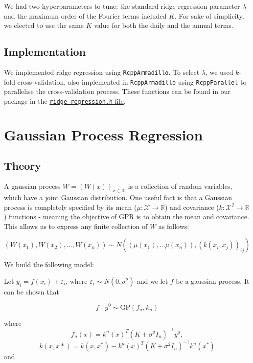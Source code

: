\documentclass[
]{article}
\begin{document}
We had two hyperparameters to tune: the standard ridge regression
parameter \(\lambda\) and the maximum order of the Fourier terms
included \(K\). For sake of simplicity, we elected to use the same \(K\)
value for both the daily and the annual terms.

\hypertarget{implementation}{%
\subsection{Implementation}\label{implementation}}

We implemented ridge regression using \texttt{RcppArmadillo}. To select
\(\lambda\), we used \(k\)-fold cross-validation, also implemented in
\texttt{RcppArmadillo} using \texttt{RcppParallel} to parallelise the
cross-validation process. These functions can be found in our package in
the
\href{https://github.com/Shermjj/SC-2-Electric-Boogalo/blob/main/ElecForecast/src/ridge_regression.h}{\texttt{ridge\_regression.h}
file}.

\hypertarget{gaussian-process-regression}{%
\section{Gaussian Process
Regression}\label{gaussian-process-regression}}

\hypertarget{theory-1}{%
\subsection{Theory}\label{theory-1}}

A gaussian process \(W = (W(x))_{x \in \mathcal{X}}\) is a collection of
random variables, which have a joint Gaussian distribution. One useful
fact is that a Gaussian process is completely specified by its mean
(\(\mu:\mathcal{X} \rightarrow \mathbb{R}\)) and covariance
(\(k:\mathcal{X}^2 \rightarrow \mathbb{R}\)) functions - meaning the
objective of GPR is to obtain the mean and covariance. This allows us to
express any finite collection of \(W\) as follows:

\[
(W(x_1), W(x_2), ..., W(x_n)) \sim N((\mu(x_1),...\mu(x_n)), (k(x_i,x_j))_{ij})
\]

We build the following model:

Let \(y_i = f(x_i) + \varepsilon_i\), where
\(\varepsilon_i \sim N(0, \sigma^2)\) and we let \(f\) be a gaussian
process. It can be shown that

\[
f \mid y^0 \sim \text{GP}(f_n,k_n)
\]

where \[f_n(x) = k^n(x)^T(K + \sigma^2I_n)^{-1}y^0,\]
\[k(x,x*) = k(x, x^*) - k^n(x)^T (K + \sigma^2 I_n)^{-1} k^n(x^*)\] and
\end{document}
